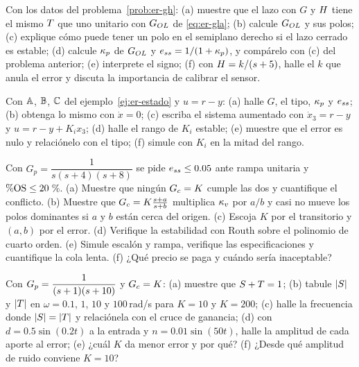 \begin{problema}\label{prob:er-gla}
Con los datos del problema~\ref{prob:er-gh}: (a) muestre que el lazo con $G$ y $H$ tiene el mismo $T$ que uno unitario con $G_{OL}$ de \eqref{eq:er-gla}; (b) calcule $G_{OL}$ y sus polos; (c) explique cómo puede tener un polo en el semiplano derecho si el lazo cerrado es estable; (d) calcule $\kappa_p$ de $G_{OL}$ y $e_{ss}=1/(1+\kappa_p)$, y compárelo con (c) del problema anterior; (e) interprete el signo; (f) con $H=k/(s+5)$, halle el $k$ que anula el error y discuta la importancia de calibrar el sensor.
\end{problema}

\begin{problema}\label{prob:er-estado}
Con $\mathbb{A}$, $\mathbb{B}$, $\mathbb{C}$ del ejemplo~\ref{ej:er-estado} y $u=r-y$: (a) halle $G$, el tipo, $\kappa_p$ y $e_{ss}$; (b) obtenga lo mismo con $\dot x=0$; (c) escriba el sistema aumentado con $\dot x_3=r-y$ y $u=r-y+K_ix_3$; (d) halle el rango de $K_i$ estable; (e) muestre que el error es nulo y relaciónelo con el tipo; (f) \etiquetaM{} simule con $K_i$ en la mitad del rango.
\end{problema}

\begin{problema}[atraso]\label{prob:er-atraso}
Con $G_p=\dfrac{1}{s(s+4)(s+8)}$ se pide $e_{ss}\le0.05$ ante rampa unitaria y $\%\mathrm{OS}\le20$\,\%. (a) Muestre que ningún $G_c=K$ cumple las dos y cuantifique el conflicto. (b) Muestre que $G_c=K\frac{s+a}{s+b}$ multiplica $\kappa_v$ por $a/b$ y casi no mueve los polos dominantes si $a$ y $b$ están cerca del origen. (c) Escoja $K$ por el transitorio y $(a,b)$ por el error. (d) Verifique la estabilidad con Routh sobre el polinomio de cuarto orden. (e) \etiquetaM{} Simule escalón y rampa, verifique las especificaciones y cuantifique la cola lenta. (f) ¿Qué precio se paga y cuándo sería inaceptable?
\end{problema}

\begin{problema}[sensitividad]\label{prob:er-sens}
Con $G_p=\dfrac{1}{(s+1)(s+10)}$ y $G_c=K$: (a) muestre que $S+T=1$; (b) \etiquetaM{} tabule $|S|$ y $|T|$ en $\omega=0.1$, $1$, $10$ y $100$\,rad/s para $K=10$ y $K=200$; (c) halle la frecuencia donde $|S|=|T|$ y relaciónela con el cruce de ganancia; (d) con $d=0.5\sin(0.2t)$ a la entrada y $n=0.01\sin(50t)$, halle la amplitud de cada aporte al error; (e) ¿cuál $K$ da menor error y por qué? (f) \etiquetaEstrella{} ¿Desde qué amplitud de ruido conviene $K=10$?
\end{problema}

